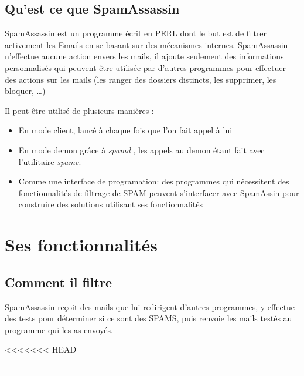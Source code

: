 \documentclass[a4paper,11pt]{article}
\begin{document}
\subsection{Qu'est ce que SpamAssassin}

SpamAssassin est un programme écrit en PERL dont le but est de filtrer activement les Emails en se basant sur des mécanismes internes. 
SpamAssassin n'effectue aucune action envers les mails, il ajoute seulement des informations personnalisés
qui peuvent être utilisée par d'autres programmes pour effectuer des actions sur les mails (les ranger des dossiers distincts, les supprimer, les bloquer, \dots)


Il peut être utilisé de plusieurs manières :
\begin{itemize}
 \item En mode client, lancé à chaque fois que l'on fait appel à lui
 \item En mode demon grâce à \emph{spamd} , les appels au demon étant fait avec l'utilitaire \emph{spamc}.
 \item Comme une interface de programation: des programmes qui nécessitent des fonctionnalités de filtrage de SPAM peuvent s'interfacer avec SpamAssin
 pour construire des solutions utilisant ses fonctionnalités
\end{itemize}

\pagebreak

\section{Ses fonctionnalités}

\subsection{Comment il filtre}

SpamAssassin reçoit des mails que lui redirigent d'autres programmes, y effectue des tests pour déterminer si ce sont des SPAMS, 
puis renvoie les mails testés au programme qui les as envoyés.

<<<<<<< HEAD

=======
\end{document}
